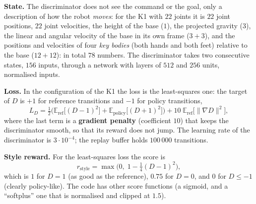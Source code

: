 \textbf{State.} The discriminator does not see the command or the goal, only a description of how the robot \emph{moves}: for the K1 with $22$ joints it is $22$ joint positions, $22$ joint velocities, the height of the base ($1$), the projected gravity ($3$), the linear and angular velocity of the base in its own frame ($3+3$), and the positions and velocities of four \emph{key bodies} (both hands and both feet) relative to the base ($12+12$): in total $78$ numbers. The discriminator takes two consecutive states, $156$ inputs, through a network with layers of $512$ and $256$ units, normalised inputs.

\textbf{Loss.} In the configuration of the K1 the loss is the least-squares one: the target of $D$ is $+1$ for reference transitions and $-1$ for policy transitions,
\[
L_D=\tfrac12\Big(\mathbb E_{\text{ref}}\big[(D-1)^2\big]+\mathbb E_{\text{policy}}\big[(D+1)^2\big]\Big)+10\;\mathbb E_{\text{ref}}\big[\|\nabla D\|^2\big],
\]
where the last term is a \textbf{gradient penalty} (coefficient $10$) that keeps the discriminator smooth, so that its reward does not jump. The learning rate of the discriminator is $3\cdot10^{-4}$; the replay buffer holds $100\,000$ transitions.

\textbf{Style reward.} For the least-squares loss the score is
\[
r_{\text{style}}=\max\!\big(0,\;1-\tfrac14(D-1)^2\big),
\]
which is $1$ for $D=1$ (as good as the reference), $0.75$ for $D=0$, and $0$ for $D\le-1$ (clearly policy-like). The code has other score functions (a sigmoid, and a ``softplus'' one that is normalised and clipped at $1.5$).

\begin{center}
\end{center}


